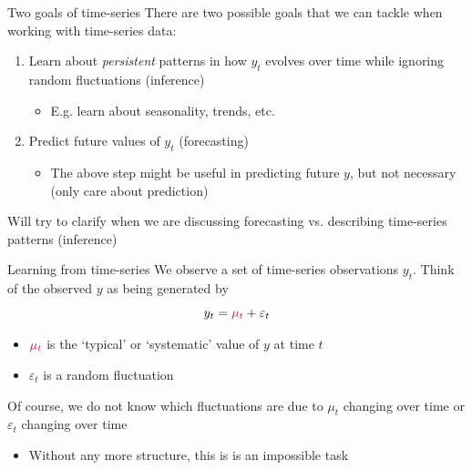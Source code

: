 \documentclass[aspectratio=169,t,11pt,table]{beamer}
\begin{document}
\begin{frame}{Two goals of time-series}
  There are two possible goals that we can tackle when working with time-series data:
  \begin{enumerate}
    \item Learn about \emph{persistent} patterns in how $y_t$ evolves over time while ignoring random fluctuations (inference)
    \begin{itemize}
      \item E.g. learn about seasonality, trends, etc.
    \end{itemize}
    
    \medskip
    \item Predict future values of $y_t$ (forecasting)
    \begin{itemize}
      \item The above step might be useful in predicting future $y$, but not necessary (only care about prediction)
    \end{itemize}
  \end{enumerate}

  \bigskip
  Will try to clarify when we are discussing forecasting vs. describing time-series patterns (inference)
\end{frame}

\begin{frame}{Learning from time-series}
  We observe a set of time-series observations $y_t$. Think of the observed $y$ as being generated by 
  $$
    y_t = {\color[HTML]{B3114B} \mu_t} + \varepsilon_t
  $$
  \begin{itemize}
    \item ${\color[HTML]{B3114B} \mu_t}$ is the `typical' or `systematic' value of $y$ at time $t$
    
    \item $\varepsilon_t$ is a random fluctuation
  \end{itemize}

  \bigskip
  Of course, we do not know which fluctuations are due to $\mu_t$ changing over time or $\varepsilon_t$ changing over time
  \begin{itemize}
    \item Without any more structure, this is is an impossible task
  \end{itemize}
\end{frame}
\end{document}
